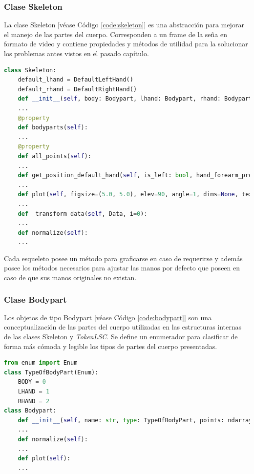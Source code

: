 \subsubsection{Clase Skeleton}
La clase Skeleton [véase Código \ref{code:skeleton}] es una abstracción para mejorar el manejo de las partes del cuerpo. Corresponden a un frame de la seña en formato de video y contiene propiedades y métodos de utilidad para la solucionar los problemas antes vistos en el pasado capítulo. 

\begin{lstlisting}[basicstyle=\tiny,language=Python, caption={Clase de Skeleton}, label={code:skeleton}]
class Skeleton:
    default_lhand = DefaultLeftHand()
    default_rhand = DefaultRightHand()
    def __init__(self, body: Bodypart, lhand: Bodypart, rhand: Bodypart):
    ...
    @property
    def bodyparts(self):
    ...
    @property
    def all_points(self):
    ...
    def get_position_default_hand(self, is_left: bool, hand_forearm_proportion=1/11.15, finger_proportion=1/0.68):
    ...
    def plot(self, figsize=(5.0, 5.0), elev=90, angle=1, dims=None, text=False, joints=True):
    ...
    def _transform_data(self, Data, i=0):
    ...
    def normalize(self):
    ...
\end{lstlisting}
Cada esqueleto posee un método para graficarse en caso de requerirse y además posee los métodos necesarios para ajustar las manos por defecto que poseen en caso de que sus manos originales no existan.

\subsubsection{Clase Bodypart}

Los objetos de tipo Bodypart [véase Código \ref{code:bodypart}] son una conceptualización de las partes del cuerpo utilizadas en las estructuras internas de las clases Skeleton y \textit{TokenLSC}. Se define un enumerador para clasificar de forma más cómoda y legible los tipos de partes del cuerpo presentadas.


\begin{lstlisting}[basicstyle=\tiny,language=Python, caption={Clase de Bodypart}, label={code:bodypart}]
from enum import Enum
class TypeOfBodyPart(Enum):
    BODY = 0
    LHAND = 1
    RHAND = 2
class Bodypart:
    def __init__(self, name: str, type: TypeOfBodyPart, points: ndarray):
    ...
    def normalize(self):
    ...
    def plot(self):
    ...
\end{lstlisting}


